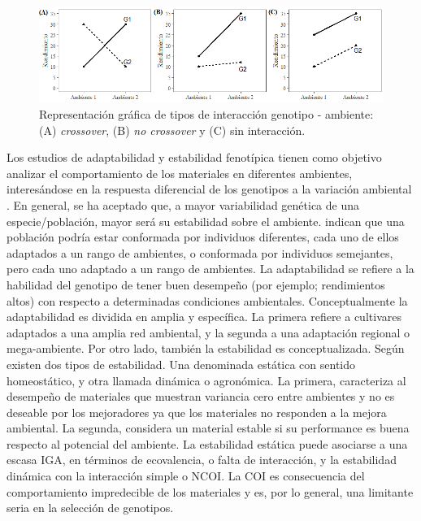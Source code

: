 \begin{figure}[h]
\begin{center}
\includegraphics[width=14cm]{./Graficos/interac}
\end{center}
\caption{  Representación gráfica de tipos de interacción genotipo - ambiente: (A) \emph{crossover}, (B) \emph{no crossover} y (C) sin interacción.}
\label{fig:fig11}
\end{figure}


Los estudios de adaptabilidad y estabilidad fenotípica tienen como objetivo analizar el comportamiento de los materiales en diferentes ambientes, interesándose en la respuesta diferencial de los genotipos a la variación ambiental \citep{Borem2001}. En general, se ha aceptado que, a mayor variabilidad genética de una especie/población, mayor será su estabilidad sobre el ambiente. \citet{AllardBradshaw1964} indican que una población podría estar conformada por individuos diferentes, cada uno de ellos adaptados a un rango de ambientes, o conformada por individuos semejantes, pero cada uno adaptado a un rango de ambientes. La adaptabilidad se refiere a la habilidad del genotipo de tener buen desempeño (por ejemplo; rendimientos altos) con respecto a determinadas condiciones ambientales.  Conceptualmente la adaptabilidad es dividida en amplia y específica. La primera refiere a cultivares adaptados a una amplia red ambiental, y la segunda a una adaptación regional o mega-ambiente. Por otro lado, también la estabilidad es conceptualizada. Según \citet{Becker1981} existen dos tipos de estabilidad. Una denominada estática con sentido homeostático, y otra llamada dinámica o agronómica. La primera, caracteriza al desempeño de materiales que muestran variancia cero entre ambientes y no es deseable por los mejoradores ya que los materiales no responden a la mejora ambiental. La segunda, considera un material estable si su performance es buena respecto al potencial del ambiente. La estabilidad estática puede asociarse a una escasa IGA, en términos de ecovalencia, o falta de interacción, y la estabilidad dinámica con la interacción simple o NCOI. La COI es consecuencia del comportamiento impredecible de los materiales y es, por lo general, una limitante seria en la selección de genotipos.

